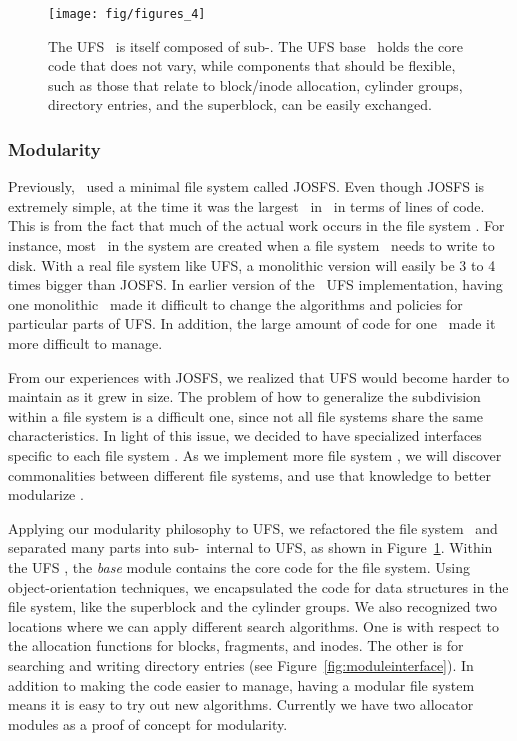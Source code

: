 \begin{figure}[htb]
  \centering
  \texttt{[image: fig/figures\_4]}
  \caption{\label{fig:ufsmodules} The UFS \module\ is itself composed of
  sub-\modules. The UFS base \module\ holds the core code that does not
  vary, while components that should be flexible, such as those that relate
  to block/inode allocation, cylinder groups, directory entries, and the
  superblock, can be easily exchanged.}
\end{figure}

\subsubsection {Modularity}
Previously, \Kudos\ used a minimal file system called JOSFS. Even though JOSFS
is extremely simple, at the time it was the largest \module\ in \Kudos\ in
terms of lines of code. This is from the fact that much of the actual work
occurs in the file system \modules. For instance, most \chdescs\ in the system
are created when a file system \module\ needs to write to disk. With a real
file system like UFS, a monolithic version will easily be 3 to 4 times bigger
than JOSFS. In earlier version of the \Kudos\ UFS implementation, having one
monolithic \module\ made it difficult to change the algorithms and policies
for particular parts of UFS. In addition, the large amount of code for one
\module\ made it more difficult to manage.

From our experiences with JOSFS, we realized that UFS would become harder to
maintain as it grew in size. The problem of how to generalize the subdivision
within a file system is a difficult one, since not all file systems share the
same characteristics. In light of this issue, we decided to have specialized
interfaces specific to each file system \module. As we implement more file
system \modules, we will discover commonalities between different file systems,
and use that knowledge to better modularize \Kudos.

Applying our modularity philosophy to UFS, we refactored the file system
\module\ and separated many parts into sub-\modules\ internal to UFS, as shown
in Figure~\ref{fig:ufsmodules}. Within the UFS \module, the \emph{base} module
contains the core code for the file system. Using object-orientation
techniques, we encapsulated the code for data structures in the file system,
like the superblock and the cylinder groups. We also recognized two locations
where we can apply different search algorithms. One is with respect to the
allocation functions for blocks, fragments, and inodes. The other is for
searching and writing directory entries (see Figure~\ref{fig:moduleinterface}).
In addition to making the code easier to manage, having a modular file system
means it is easy to try out new algorithms. Currently we have two allocator
modules as a proof of concept for modularity.

